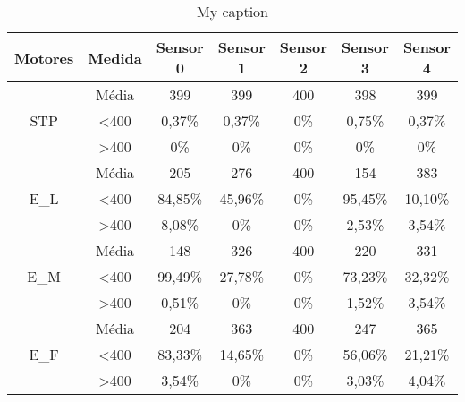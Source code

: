 \begin{table}[]
\centering
\caption{My caption}
\label{my-label}
\begin{tabular}{|c|c|ccccc|}
\hline
\textbf{Motores}                & \textbf{Medida}  & \textbf{Sensor 0} & \textbf{Sensor 1} & \textbf{Sensor 2} & \textbf{Sensor 3} & \textbf{Sensor 4} \\ \hline
\multirow{3}{*}{STP}            & Média            & 399               & 399               & 400               & 398               & 399               \\
                                & \textless 400    & 0,37\%            & 0,37\%            & 0\%            & 0,75\%            & 0,37\%            \\
                                & \textgreater 400 & 0\%            & 0\%            & 0\%            & 0\%            & 0\%            \\ \hline
\multirow{3}{*}{E\_L}           & Média            & 205               & 276               & 400               & 154               & 383               \\
                                & \textless 400    & 84,85\%           & 45,96\%           & 0\%            & 95,45\%           & 10,10\%           \\
                                & \textgreater 400 & 8,08\%            & 0\%            & 0\%            & 2,53\%            & 3,54\%            \\ \hline
\multirow{3}{*}{E\_M}           & Média            & 148               & 326               & 400               & 220               & 331               \\
                                & \textless 400    & 99,49\%           & 27,78\%           & 0\%            & 73,23\%           & 32,32\%           \\
                                & \textgreater 400 & 0,51\%            & 0\%            & 0\%            & 1,52\%            & 3,54\%            \\ \hline
\multirow{3}{*}{E\_F}           & Média            & 204               & 363               & 400               & 247               & 365               \\
                                & \textless 400    & 83,33\%           & 14,65\%           & 0\%            & 56,06\%           & 21,21\%           \\
                                & \textgreater 400 & 3,54\%            & 0\%            & 0\%            & 3,03\%            & 4,04\%            \\ \hline

\end{tabular}
\end{table}
